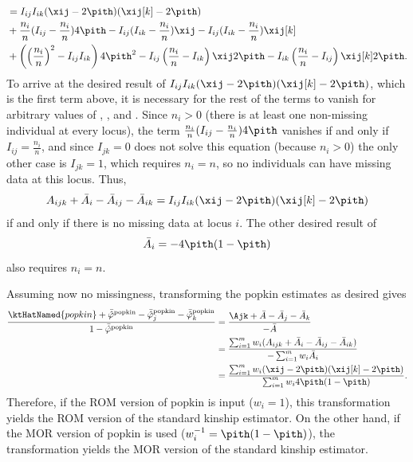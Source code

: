 \documentclass[11pt]{article}
\begin{document}
\begin{appendices}
\begin{align*}
    &=
      I_{ij} I_{ik} (\xij - 2 \pith) (\xij[k] - 2 \pith )
      \\
    &+ \frac{n_i}{n} ( I_{ij} - \frac{n_i}{n} ) 4 \pith
      - I_{ij} ( I_{ik} - \frac{n_i}{n} ) \xij
      - I_{ij} ( I_{ik} - \frac{n_i}{n} ) \xij[k] \\
    &+ \left( \left( \frac{n_i}{n} \right)^2 -  I_{ij} I_{ik} \right) 4 \pith^2
      - I_{ij} \left( \frac{n_i}{n} - I_{ik} \right) \xij 2 \pith
      - I_{ik} \left( \frac{n_i}{n} - I_{ij} \right) \xij[k] 2 \pith
      .
  \end{align*}
  To arrive at the desired result of $I_{ij} I_{ik} (\xij - 2 \pith) (\xij[k] - 2 \pith )$, which is the first term above, it is necessary for the rest of the terms to vanish for arbitrary values of \pith, \xij, and \xij[k].
  Since $n_i > 0$ (there is at least one non-missing individual at every locus), the term $\frac{n_i}{n} ( I_{ij} - \frac{n_i}{n} ) 4 \pith$ vanishes if and only if $I_{ij} = \frac{n_i}{n}$, and since $I_{jk}=0$ does not solve this equation (because $n_i > 0$) the only other case is $I_{jk}=1$, which requires $n_i=n$, so no individuals can have missing data at this locus.
  Thus,
  $$
  A_{ijk} + \bar{A}_i - \bar{A}_{ij}  - \bar{A}_{ik}
  =
  I_{ij} I_{ik} (\xij - 2 \pith) (\xij[k] - 2 \pith )
  $$
  if and only if there is no missing data at locus $i$.
  The other desired result of
  $$
  \bar{A}_i
  =
  - 4 \pith ( 1 - \pith )
  $$
  also requires $n_i = n$.

  Assuming now no missingness, transforming the popkin estimates as desired gives
  \begin{align*}
    \frac{
    \ktHatNamed{popkin}
    + \bar{ \hat{ \varphi } }^\text{popkin}
    - \bar{ \hat{ \varphi } }_j^\text{popkin}
    - \bar{ \hat{ \varphi } }_k^\text{popkin}
    }{
    1 - \bar{ \hat{ \varphi } }^\text{popkin}
    }
    &=
      \frac{
      \Ajk
      + \bar{A}
      - \bar{A}_j
      - \bar{A}_k
      }{
      - \bar{A}
      }
    \\
    &=
      \frac{
      \sum_{i=1}^m w_i ( A_{ijk} + \bar{A}_i - \bar{A}_{ij} - \bar{A}_{ik} )
      }{
      - \sum_{i=1}^m w_i \bar{A}_i
      }
    \\
    &=
      \frac{
      \sum_{i=1}^m w_i (\xij - 2 \pith) (\xij[k] - 2 \pith )
      }{
      \sum_{i=1}^m w_i 4 \pith ( 1 - \pith )
      }
      .
  \end{align*}
  Therefore, if the ROM version of popkin is input ($w_i=1$), this transformation yields the ROM version of the standard kinship estimator.
  On the other hand, if the MOR version of popkin is used ($w_i^{-1} = \pith ( 1 - \pith )$), the transformation yields the MOR version of the standard kinship estimator.
  

\end{appendices}
\end{document}
